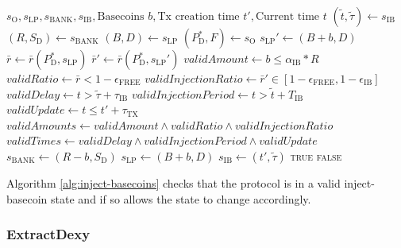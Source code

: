 \documentclass{ifcolog}
\newcommand{\Pdt}{P_{\mathrm{D}}^{*}}
\newcommand{\Sd}{S_{\mathrm{D}}}
\newcommand{\rr}{\bar{r}}
\newcommand{\sbank}{s_{\textrm{BANK}}}
\newcommand{\slp}{s_{\mathrm{LP}}}
\newcommand{\soracle}{s_{\textrm{O}}}
\newcommand{\sib}{s_{\textrm{IB}}}
\newcommand{\tautx}{\tau_{\textrm{TX}}}
\newcommand{\epsilonfree}{\epsilon_{\textrm{FREE}}}
\newcommand{\epsilonib}{\epsilon_{\textrm{IB}}}
\begin{document}
\begin{algorithm}[H]
\caption{InjectBasecoins}\label{alg:inject-basecoins}
\begin{algorithmic}[1]
  \Require $\soracle, \slp, \sbank, \sib, \textrm{Basecoins } b, \textrm{Tx creation time } t', \textrm{Current time } t$
  \State $(\tilde{t}, \tilde{\tau}) \gets \sib$
  \State $(R, \Sd) \gets \sbank$
  \State $(B, D) \gets \slp$
  \State $(\Pdt, F) \gets \soracle$
  \State $\slp' \gets (B + b, D)$
  \State $\rr \gets \rr(\Pdt, \slp) $
  \State $\rr' \gets \rr(\Pdt, \slp')$
  \State $validAmount \gets b \le \alpha_{\textrm{IB}} * R$
  \State $validRatio \gets \rr < 1 - \epsilonfree$
  \State $validInjectionRatio \gets \rr' \in \left[ 1-\epsilonfree, 1 - \epsilonib \right]$
  \State $validDelay \gets t > \tilde{\tau} + \tau_{\textrm{IB}}$
  \State $validInjectionPeriod \gets t > \tilde{t} + T_{\textrm{IB}}$
  \State $validUpdate \gets t \le t' + \tautx$
  \State $validAmounts \gets validAmount \land validRatio \land validInjectionRatio$
  \State $validTimes \gets validDelay \land validInjectionPeriod \land validUpdate$
    \State $\sbank \gets (R - b, \Sd)$
    \State $\slp \gets (B + b, D)$
    \State $\sib \gets (t', \tilde{\tau})$
    \State \Return \textsc{true}
  \Else
    \State \Return \textsc{false}
  \EndIf
\end{algorithmic}
\end{algorithm}

Algorithm \ref{alg:inject-basecoins} checks that the protocol is in a valid inject-basecoin state and if so allows the state to change accordingly.

\newpage

\subsubsection{ExtractDexy}
\end{document}
